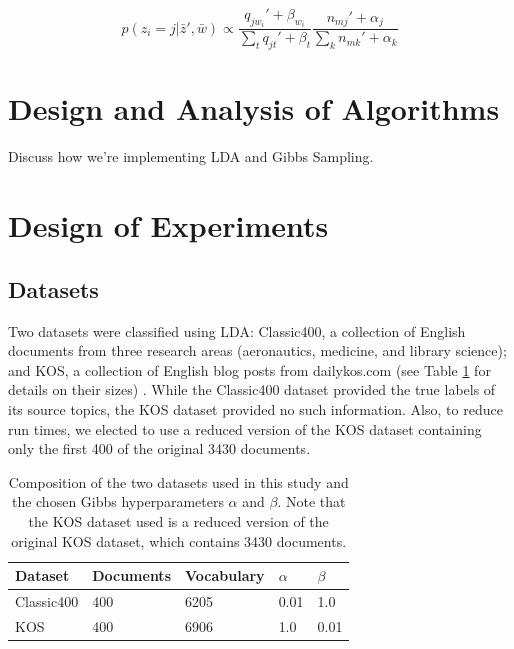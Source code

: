 \documentclass[10pt]{article}
\newcommand{\ra}[1]{\renewcommand{\arraystretch}{#1}}
\begin{document}
\begin{equation}
    p(z_i = j | \bar{z}', \bar{w}) \propto \frac{q_{j w_i}' + \beta_{w_i}}{\sum_t q_{jt}' + \beta_t} \frac{n_{mj}' + \alpha_j}{\sum_k n_{mk}' + \alpha_k}
\end{equation}



\section{Design and Analysis of Algorithms}
\label{sec:algorithms}

Discuss how we're implementing LDA and Gibbs Sampling.



\section{Design of Experiments}
\label{sec:experiments}

%
%
\subsection{Datasets}
Two datasets were classified using LDA: Classic400, a collection of English documents from three research areas (aeronautics, medicine, and library science); and KOS, a collection of English blog posts from dailykos.com (see Table \ref{tab:datasets} for details on their sizes) \cite{Classic400, KOS_dataset}. While the Classic400 dataset provided the true labels of its source topics, the KOS dataset provided no such information. Also, to reduce run times, we elected to use a reduced version of the KOS dataset containing only the first 400 of the original 3430 documents.


\begin{table}
    \centering
    \ra{1.2}
    \begin{tabular}{@{} l l l l l @{}}
        \toprule
        \bf{Dataset} & \bf{Documents} & \bf{Vocabulary} & $\alpha$ & $\beta$ \\
        \midrule
        Classic400 & 400 & 6205 & 0.01 & 1.0 \\
        KOS        & 400 & 6906 & 1.0  & 0.01\\
        \bottomrule
    \end{tabular}
    \caption{Composition of the two datasets used in this study and the chosen Gibbs hyperparameters $\alpha$ and $\beta$. Note that the KOS dataset used is a reduced version of the original KOS dataset, which contains 3430 documents.}
    \label{tab:datasets}
\end{table}
\end{document}
